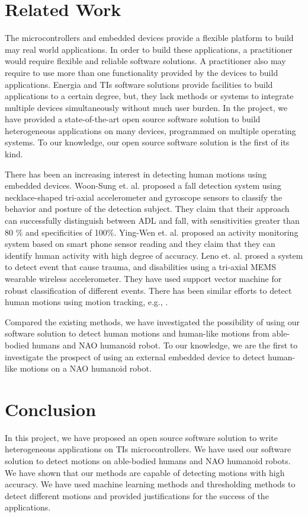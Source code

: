 \documentclass[letterpaper]{article}
\begin{document}
\section{Related Work}

The microcontrollers and embedded devices provide a flexible platform to build may real world
applications. In order to build these applications, a practitioner would require  flexible and
reliable software solutions. A practitioner also may require to use more than one functionality
provided by the devices to build applications. Energia and TIs software solutions provide
facilities to build applications to a certain degree, but, they lack methods or systems to integrate
multiple devices simultaneously without much user burden. In the project, we have provided a
state-of-the-art open source software solution to build heterogeneous applications on many devices,
programmed on multiple operating systems. To our knowledge, our open source software solution is the
first of its kind. 

There has been an increasing interest in detecting human motions using embedded devices. Woon-Sung
et. al. \cite{baek2013real} proposed  a fall  detection  system  using necklace-shaped tri-axial
accelerometer  and  gyroscope  sensors  to  classify  the  behavior  and  posture  of  the detection
 subject. They claim that their  approach  can  successfully  distinguish between  ADL and  fall, 
with  sensitivities  greater  than  80 \%  and specificities  of  100\%. Ying-Wen et. al.
\cite{bai2013recognition} proposed an activity monitoring system based on smart phone sensor
reading and they claim that they can identify human activity with high degree of accuracy. Leno et.
al. \cite{leone2013supervised} prosed a system to detect event that cause trauma, and disabilities
using a tri-axial MEMS wearable wireless accelerometer. They have used support vector machine for
robust classification of different events. There has been similar efforts to detect human motions
using motion tracking, e.g., \cite{dumitrache2013fall,kumarwearable,liang2012pre}.

Compared the existing methods, we have investigated the possibility of using our software solution
to detect human motions and human-like motions from able-bodied humans and NAO humanoid robot. To
our knowledge, we are the first to investigate the prospect of using an external embedded device to
detect human-like motions on a NAO humanoid robot. 

\section{Conclusion}

In this project, we have proposed an open source software solution to write heterogeneous
applications on TIs microcontrollers. We have used our software solution to detect motions on
able-bodied humans and NAO humanoid robots. We have shown that our methods are capable of detecting
motions with high accuracy. We have used machine learning methods and thresholding methods to
detect different motions and provided justifications for the success of the applications. 



\end{document}
